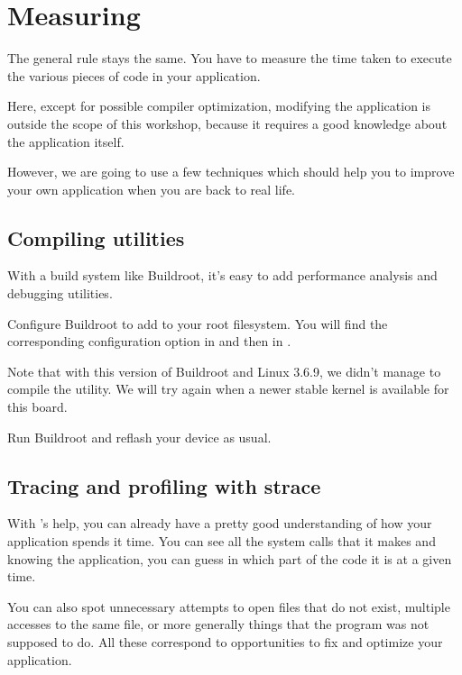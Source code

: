 
\section{Measuring}

The general rule stays the same. You have to measure the time taken to
execute the various pieces of code in your application.

Here, except for possible compiler optimization, modifying the
application is outside the scope of this workshop, because it requires
a good knowledge about the application itself.

However, we are going to use a few techniques which should help you to
improve your own application when you are back to real life.

\subsection{Compiling utilities}

With a build system like Buildroot, it's easy to add performance
analysis and debugging utilities.

Configure Buildroot to add  to your root
filesystem. You will find the corresponding configuration option in
 and then in .

Note that with this version of Buildroot and Linux 3.6.9, we didn't
manage to compile the  utility. We will try again when a
newer stable kernel is available for this board.

Run Buildroot and reflash your device as usual.

\subsection{Tracing and profiling with strace}

With 's help, you can already have a pretty good understanding
of how your application spends it time. You can see all the system
calls that it makes and knowing the application, you can guess in which
part of the code it is at a given time.

You can also spot unnecessary attempts to open files that do not exist,
multiple accesses to the same file, or more generally things that the
program was not supposed to do. All these correspond to opportunities
to fix and optimize your application.


